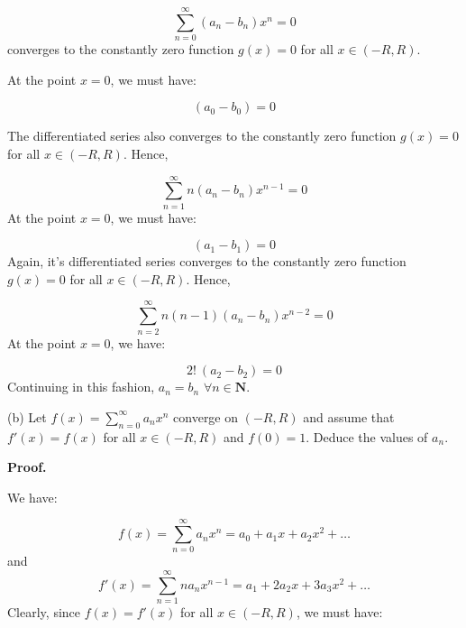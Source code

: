 \documentclass[10pt]{article}
\begin{document}
\begin{equation*}
\sum _{n=0}^{\infty }( a_{n} -b_{n}) x^{n} =0
\end{equation*}
converges to the constantly zero function $\displaystyle g( x) =0$ for all $\displaystyle x\in ( -R,R)$. 



At the point $\displaystyle x=0$, we must have: 


\begin{equation*}
( a_{0} -b_{0}) =0
\end{equation*}


The differentiated series also converges to the constantly zero function $\displaystyle g( x) =0$ for all $\displaystyle x\in ( -R,R)$. Hence,


\begin{equation*}
\sum _{n=1}^{\infty } n( a_{n} -b_{n}) x^{n-1} =0
\end{equation*}
At the point $\displaystyle x=0$, we must have:


\begin{equation*}
( a_{1} -b_{1}) =0
\end{equation*}
Again, it's differentiated series converges to the constantly zero function $\displaystyle g( x) =0$ for all $\displaystyle x\in ( -R,R)$. Hence,




\begin{equation*}
\sum _{n=2}^{\infty } n( n-1)( a_{n} -b_{n}) x^{n-2} =0
\end{equation*}
At the point $\displaystyle x=0$, we have:


\begin{equation*}
2!\ ( a_{2} -b_{2}) =0
\end{equation*}
Continuing in this fashion, $\displaystyle a_{n} =b_{n}$ $\displaystyle \forall n\in \mathbf{N}$.



(b) Let $\displaystyle f( x) =\sum _{n=0}^{\infty } a_{n} x^{n}$ converge on $\displaystyle ( -R,R)$ and assume that $\displaystyle f'( x) =f( x)$ for all $\displaystyle x\in ( -R,R)$ and $\displaystyle f( 0) =1$. Deduce the values of $\displaystyle a_{n}$. 



\textbf{Proof.}



We have:


\begin{equation*}
f( x) =\sum _{n=0}^{\infty } a_{n} x^{n} =a_{0} +a_{1} x+a_{2} x^{2} +\dotsc 
\end{equation*}
and
\begin{equation*}
f'( x) =\sum _{n=1}^{\infty } na_{n} x^{n-1} =a_{1} +2a_{2} x+3a_{3} x^{2} +\dotsc 
\end{equation*}
Clearly, since $\displaystyle f( x) =f'( x)$ for all $\displaystyle x\in ( -R,R)$, we must have:
\end{document}
